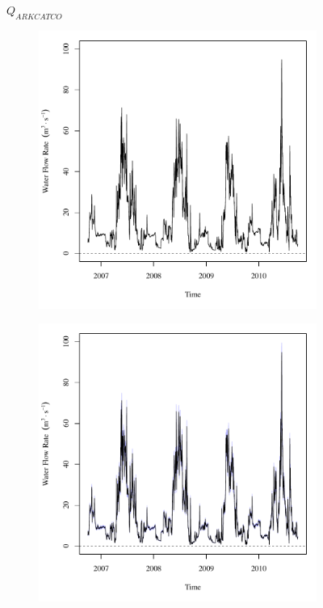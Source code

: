 \subfiguretop
\begin{landscape}
	\begin{figure}
		\centering
		$ Q_{ARKCATCO} $
		\begin{subfigure}{0.7\textwidth}
			\centering
			\includegraphics[width=\tableCustomSize]{"Figures/Results_USR/Deterministic/Q U163"}
		\end{subfigure}%
		\begin{subfigure}{0.7\textwidth}
			\centering
			\includegraphics[width=\tableCustomSize]{"Figures/Results_USR/Stochastic/Q U163"}

\end{subfigure}
\end{figure}
\end{landscape}
